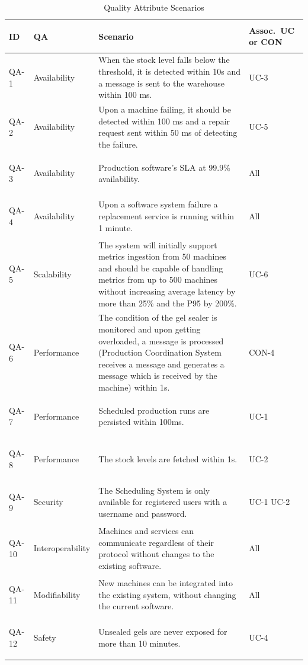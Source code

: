 \documentclass[conference]{IEEEtran}
\begin{document}
\begin{table}[htbp]
  \centering
  \caption{Quality Attribute Scenarios}
  \label{tab:QAS}
  \footnotesize
  \renewcommand{\arraystretch}{1.3}
  \setlength{\tabcolsep}{4pt}%
  \begin{tabularx}{\columnwidth}{|>{\bfseries\raggedright\arraybackslash}p{}|>{\raggedright\arraybackslash\hspace{0pt}}p{}|Y|>{\raggedright\arraybackslash\hspace{0pt}}p{0.12\columnwidth}|}
    \hline
    \textbf{ID} & \textbf{QA} & \textbf{Scenario} & \textbf{Assoc.\ UC or CON} \\ \hline
    QA-1 & Availability & When the stock level falls below the threshold, it is detected within 10s and a message is sent to the warehouse within 100 ms. & UC-3 \\ \hline
    QA-2 & Availability & Upon a machine failing, it should be detected within 100 ms and a repair request sent within 50 ms of detecting the failure. & UC-5 \\ \hline
    QA-3 & Availability & Production software’s SLA at 99.9\% availability. & All \\ \hline
    QA-4 & Availability & Upon a software system failure a replacement service is running within 1 minute. & All \\ \hline
    QA-5 & Scalability & The system will initially support metrics ingestion from 50 machines and should be capable of handling metrics from up to 500 machines without increasing average latency by more than 25\% and the P95 by 200\%. & UC-6 \\ \hline
    QA-6 & Performance & The condition of the gel sealer is monitored and upon getting overloaded, a message is processed (Production Coordination System receives a message and generates a message which is received by the machine) within 1s. & CON-4 \\ \hline
    QA-7 & Performance & Scheduled production runs are persisted within 100ms. & UC-1 \\ \hline
    QA-8 & Performance & The stock levels are fetched within 1s. & UC-2 \\ \hline
    QA-9 & Security & The Scheduling System is only available for registered users with a username and password. & UC-1  UC-2 \\ \hline
    QA-10 & Interoperability & Machines and services can communicate regardless of their protocol without changes to the existing software. & All \\ \hline
    QA-11 & Modifiability & New machines can be integrated into the existing system, without changing the current software. & All \\ \hline
    QA-12 & Safety & Unsealed gels are never exposed for more than 10 minutes. & UC-4 \\ \hline
  \end{tabularx}
\end{table}
\end{document}
